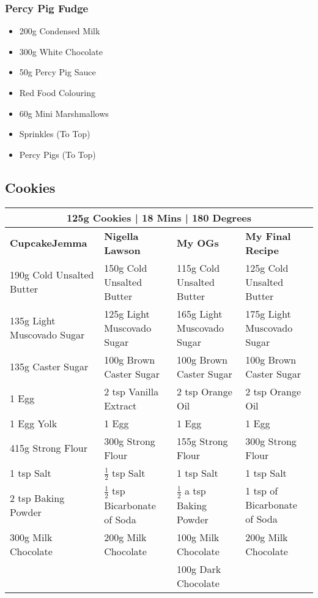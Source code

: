 \documentclass[11pt, english]{article}
\begin{document}
		\subsubsection*{Percy Pig Fudge}

	\begin{itemize}
        \setlength\itemsep{0cm}
                \item 200g Condensed Milk
		\item 300g White Chocolate
		\item 50g Percy Pig Sauce
		\item Red Food Colouring
		\item 60g Mini Marshmallows
		\item Sprinkles (To Top)
		\item Percy Pigs (To Top)
        \end{itemize}

\newpage

	\subsection{Cookies}

	\begin{table}[h]
	        \scriptsize
	\begin{center}
	\begin{tabular}{p{4cm}p{4cm}p{4cm}p{4cm}}
	        \multicolumn{4}{c}{125g Cookies | 18 Mins | 180 Degrees}\\
	        \hline
	        \textbf{CupcakeJemma} & \textbf{Nigella Lawson} & \textbf{My OGs} & \textbf{My Final Recipe}\\
	        \hline
	        190g Cold Unsalted Butter & 150g Cold Unsalted Butter & 115g Cold Unsalted Butter & 125g Cold Unsalted Butter\\
	        135g Light Muscovado Sugar & 125g Light Muscovado Sugar & 165g Light Muscovado Sugar & 175g Light Muscovado Sugar\\
	        135g Caster Sugar & 100g Brown Caster Sugar & 100g Brown Caster Sugar & 100g Brown Caster Sugar\\
	        1 Egg & 2 tsp Vanilla Extract & 2 tsp Orange Oil & 2 tsp Orange Oil\\
	        1 Egg Yolk & 1 Egg & 1 Egg & 1 Egg\\
	        415g Strong Flour & 300g Strong Flour & 155g Strong Flour & 300g Strong Flour\\
	        1 tsp Salt & $\frac{1}{2}$ tsp Salt & 1 tsp Salt & 1 tsp Salt\\
	        2 tsp Baking Powder & $\frac{1}{2}$ tsp Bicarbonate of Soda & $\frac{1}{2}$ a tsp Baking Powder & 1 tsp of Bicarbonate of Soda\\
	        300g Milk Chocolate & 200g Milk Chocolate & 100g Milk Chocolate & 200g Milk Chocolate\\
	        & & 100g Dark Chocolate & \\
	        \hline
	\end{tabular}
	\end{center}
	\end{table}
\end{document}

